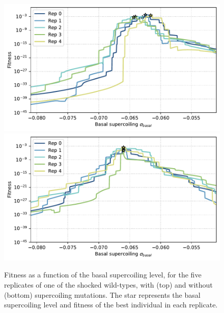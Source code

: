 \begin{figure}
\centering
\includegraphics[width=\textwidth]{epistasis/img/with-sc/fitness_landscapes_evolved_wt_01_shuffle_00.pdf}
\includegraphics[width=\textwidth]{epistasis/img/control/fitness_landscapes_evolved_wt_01_shuffle_00.pdf}
\caption[Supercoiling fitness landscapes after evolution after an environmental shock with and without supercoiling mutations]{Fitness as a function of the basal supercoiling level, for the five replicates of one of the shocked wild-types, with (top) and without (bottom) supercoiling mutations.
The star represents the basal supercoiling level and fitness of the best individual in each replicate.}
\label{fig:epistasis:fitness-landscapes-evolved}
\end{figure}

